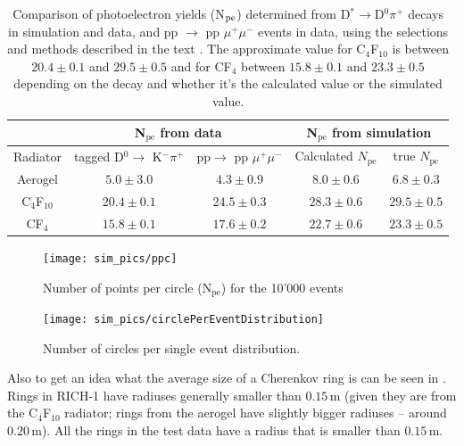 \documentclass[11pt,twoside]{scrreprt}
\begin{document}
\begin{table}[tb]
\centering
\begin{tabular}{|c| c| c | c |c|}
\hline\hline
 & \multicolumn{2}{|c|}{N$_{\text{pe}}$ from data} & \multicolumn{2}{|c|}{N$_{\text{pe}}$ from simulation} \\ \hline
Radiator &  tagged D$^0 \rightarrow$ K$^- \pi^+$ &pp$ \rightarrow$ pp $\mu^+ \mu^-$ & Calculated $N_{\text{pe}}$ & true $N_{\text{pe}}$ \\ [0.5ex]
\hline
Aerogel & $5.0 \pm 3.0$  & $4.3 \pm 0.9$& $8.0 \pm 0.6$ & $6.8 \pm 0.3$ \\ \hline
C$_4$F$_{10}$  & $20.4 \pm 0.1$ & $24.5 \pm 0.3$& $28.3 \pm 0.6$ & $29.5 \pm 0.5$ \\ \hline
CF$_4$ & $ 15.8 \pm 0.1$  & $ 17.6 \pm 0.2$& $22.7 \pm 0.6$ & $23.3 \pm 0.5$ \\ 
\hline
\end{tabular}
\caption[Comparison of photoelectron yields (N$_{\rm pe}$)]{Comparison of photoelectron yields (N$_{\rm pe}$) determined from
D$^* \rightarrow$D$^0\pi^+$ decays in simulation and data, and 
pp $\rightarrow$ pp $\mu^+ \mu^-$ events in data, using the selections and 
methods described in the text \cite{RICHPerf2012}. The approximate value for 
C$_4$F$_{10}$ is between  $20.4 \pm 0.1$ and $29.5 \pm 0.5$ and for CF$_4$ between
$ 15.8 \pm 0.1$ and $23.3 \pm 0.5$ depending on the decay and whether it's the 
calculated value or the simulated value.}
\label{table:results}
\end{table}

\begin{figure}[tb]
  \centering
  \texttt{[image: sim\_pics/ppc]}
  \caption{Number of points per circle (N$_\text{pe}$) for the 10'000 events}
  \label{fig:ppc1}
\end{figure}

\begin{figure}[tb]
  \centering
  \texttt{[image: sim\_pics/circlePerEventDistribution]}
  \caption{Number of circles per single event distribution.}
  \label{fig:circlePerEventDist}
\end{figure}

Also to get an idea what the average size of a Cherenkov ring is can be seen in
\cite{Forty1999}. Rings in RICH-1 have radiuses generally smaller than $0.15$\,m
(given they are from the C$_4$F$_{10}$ radiator; rings from the aerogel have
slightly bigger radiuses -- around $0.20$\,m). All the rings in the test data 
have a radius that is smaller than $0.15$\,m.
\end{document}
